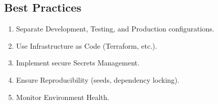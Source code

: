 \begin{TNtwocol}
\subsection{Best Practices}
\begin{enumerate}
    \item Separate Development, Testing, and Production configurations.
    \item Use Infrastructure as Code (Terraform, etc.).
    \item Implement secure Secrets Management.
    \item Ensure Reproducibility (seeds, dependency locking).
    \item Monitor Environment Health.
\end{enumerate}
\end{TNtwocol}
